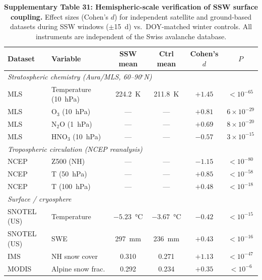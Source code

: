 \begin{table}[!ht]
\centering
\caption{\textbf{Supplementary Table 31: Hemispheric-scale verification of SSW surface coupling.}
Effect sizes (Cohen's $d$) for independent satellite and ground-based datasets during SSW windows ($\pm$15~d) vs.\ DOY-matched winter controls. All instruments are independent of the Swiss avalanche database.}
\label{tab:hemispheric}
\small
\begin{tabular}{llcccc}
\toprule
Dataset & Variable & SSW mean & Ctrl mean & Cohen's $d$ & $P$ \\
\midrule
\multicolumn{6}{l}{\textit{Stratospheric chemistry (Aura/MLS, 60--90$^\circ$N)}} \\
MLS & Temperature (10~hPa) & 224.2~K & 211.8~K & $+1.45$ & $< 10^{-65}$ \\
MLS & O$_3$ (10~hPa) & --- & --- & $+0.81$ & $6 \times 10^{-29}$ \\
MLS & N$_2$O (1~hPa) & --- & --- & $+0.69$ & $8 \times 10^{-20}$ \\
MLS & HNO$_3$ (10~hPa) & --- & --- & $-0.57$ & $3 \times 10^{-15}$ \\
\midrule
\multicolumn{6}{l}{\textit{Tropospheric circulation (NCEP reanalysis)}} \\
NCEP & Z500 (NH) & --- & --- & $-1.15$ & $< 10^{-80}$ \\
NCEP & T (50~hPa) & --- & --- & $+0.85$ & $< 10^{-58}$ \\
NCEP & T (100~hPa) & --- & --- & $+0.48$ & $< 10^{-18}$ \\
\midrule
\multicolumn{6}{l}{\textit{Surface / cryosphere}} \\
SNOTEL (US) & Temperature & $-5.23$~°C & $-3.67$~°C & $-0.42$ & $< 10^{-15}$ \\
SNOTEL (US) & SWE & 297~mm & 236~mm & $+0.43$ & $< 10^{-16}$ \\
IMS & NH snow cover & 0.310 & 0.271 & $+1.13$ & $< 10^{-47}$ \\
MODIS & Alpine snow frac. & 0.292 & 0.234 & $+0.35$ & $< 10^{-6}$ \\
\bottomrule
\end{tabular}
\end{table}


